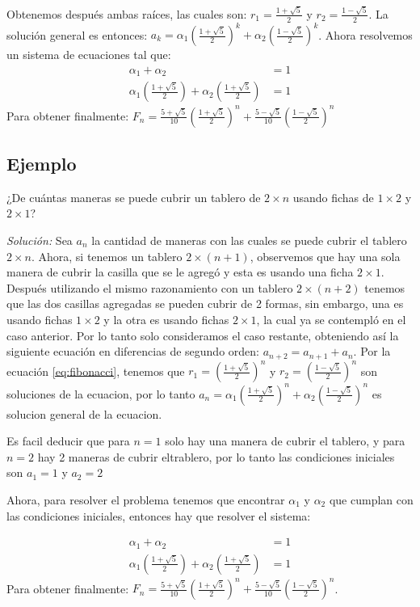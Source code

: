 \documentclass{report}
\begin{document}
Obtenemos después ambas raíces, las cuales son:
$r_{1}= \frac{1+\sqrt{5}}{2}$ y $r_{2}=\frac{1-\sqrt{5}}{2}$. La
solución general es entonces:
$a_{k}=\alpha_{1}(\frac{1+\sqrt{5}}{2})^{k} +
\alpha_{2}(\frac{1-\sqrt{5}}{2})^k$.
Ahora resolvemos un sistema de ecuaciones tal que:
\begin{align*}
\alpha_{1} + \alpha_{2} &= 1\\
\alpha_{1}(\frac{1+\sqrt{5}}{2}) + \alpha_{2}(\frac{1+\sqrt{5}}{2})&=1
\end{align*}
Para obtener finalmente:
$F_{n}= \frac{5+\sqrt{5}}{10}(\frac{1+\sqrt{5}}{2})^n +
\frac{5-\sqrt{5}}{10}(\frac{1-\sqrt{5}}{2})^n$

\subsection{Ejemplo}
\label{sec:fichas}

¿De cuántas maneras se puede cubrir un tablero de $2\times n$ usando
fichas de $1\times 2$ y $2\times 1$?

\textit{Solución:} Sea $a_n$ la cantidad de maneras con las cuales se
puede cubrir el tablero $2\times n$. Ahora, si tenemos un tablero
$2\times (n+1)$, observemos que hay una sola manera de cubrir la
casilla que se le agregó y esta es usando una ficha $2\times 1$.
Después utilizando el mismo razonamiento con un tablero
$2\times (n+2)$ tenemos que las dos casillas agregadas se pueden
cubrir de 2 formas, sin embargo, una es usando fichas $1\times 2$ y la
otra es usando fichas $2\times 1$, la cual ya se contempló en el caso
anterior. Por lo tanto solo consideramos el caso restante, obteniendo
así la siguiente ecuación en diferencias de segundo orden:
$a_{n+2}=a_{n+1}+a_n$. Por la ecuación \eqref{eq:fibonacci}, tenemos
que $r_1=(\frac{1+\sqrt{5}}{2})^n$ y $r_2=(\frac{1-\sqrt{5}}{2})^n$
son soluciones de la ecuacion, por lo tanto
$a_n=\alpha_1(\frac{1+\sqrt{5}}{2})^n +
\alpha_2(\frac{1-\sqrt{5}}{2})^n$ es solucion general de la ecuacion.


Es facil deducir que para $n=1$ solo hay una manera de cubrir el
tablero, y para $n=2$ hay 2 maneras de cubrir eltrablero, por lo tanto
las condiciones iniciales son $a_1=1$ y $a_2=2$

Ahora, para resolver el problema tenemos que encontrar $\alpha_1$ y
$\alpha_2$ que cumplan con las condiciones iniciales, entonces hay que
resolver el sistema:

\begin{align*}
\alpha_{1} + \alpha_{2} &= 1\\
\alpha_{1}(\frac{1+\sqrt{5}}{2}) + \alpha_{2}(\frac{1+\sqrt{5}}{2})&=1
\end{align*}
Para obtener finalmente:
$F_{n}= \frac{5+\sqrt{5}}{10}(\frac{1+\sqrt{5}}{2})^n +
\frac{5-\sqrt{5}}{10}(\frac{1-\sqrt{5}}{2})^n$.
\end{document}
